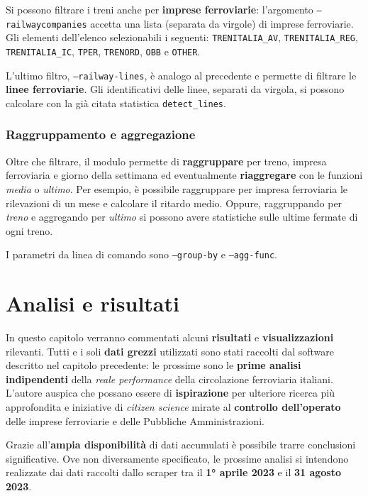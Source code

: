 \documentclass[12pt,a4paper,italian]{report}
\begin{document}
Si possono filtrare i treni anche per \textbf{imprese ferroviarie}:
l'argomento \texttt{--railway\-companies} accetta una lista (separata
da virgole) di imprese ferroviarie.  Gli elementi dell'elenco
selezionabili i seguenti: \texttt{TRENITALIA\_\-AV},
\texttt{TRENITALIA\_\-REG}, \texttt{TRENITALIA\_\-IC}, \texttt{TPER},
\texttt{TRENORD}, \texttt{OBB} e \texttt{OTHER}.

L'ultimo filtro, \texttt{--railway\--lines}, è analogo al precedente e
permette di filtrare le \textbf{linee ferroviarie}.  Gli
identificativi delle linee, separati da virgola, si possono calcolare
con la già citata statistica \texttt{detect\-\_lines}.

\subsection{Raggruppamento e aggregazione}

Oltre che filtrare, il modulo permette di \textbf{raggruppare} per
treno, impresa ferroviaria e giorno della settimana ed eventualmente
\textbf{riaggregare} con le funzioni \textit{media} o \textit{ultimo}.
Per esempio, è possibile raggruppare per impresa ferroviaria le
rilevazioni di un mese e calcolare il ritardo medio.  Oppure,
raggruppando per \textit{treno} e aggregando per \textit{ultimo} si
possono avere statistiche sulle ultime fermate di ogni treno.

I parametri da linea di comando sono \texttt{--group\--by} e
\texttt{--agg\--func}.

\chapter{Analisi e risultati}
\label{analisi}

In questo capitolo verranno commentati alcuni \textbf{risultati} e
\textbf{visualizzazioni} rilevanti.  Tutti e i soli \textbf{dati
    grezzi} utilizzati sono stati raccolti dal software descritto nel
capitolo precedente: le prossime sono le \textbf{prime analisi
    indipendenti} della \textit{reale performance} della circolazione
ferroviaria italiani.  L'autore auspica che possano essere di
\textbf{ispirazione} per ulteriore ricerca più approfondita e
iniziative di \textit{citizen science} mirate al \textbf{controllo
    dell'operato} delle imprese ferroviarie e delle Pubbliche
Amministrazioni.

Grazie all'\textbf{ampia disponibilità} di dati accumulati è possibile
trarre conclusioni significative.  Ove non diversamente specificato,
le prossime analisi si intendono realizzate dai dati raccolti dallo
scraper tra il \textbf{1° aprile 2023} e il \textbf{31 agosto 2023}.
\end{document}
